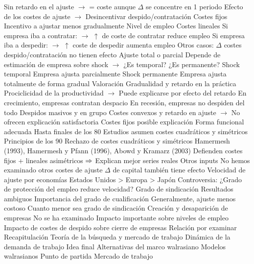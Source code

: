 \documentclass{nuevotema}
\begin{document}
\begin{esquemal}
				\4[] Sin retardo en el ajuste
				\4[] $\to$ = coste aunque $\Delta$ se concentre en 1 periodo
				\4[] Efecto de los costes de ajuste
				\4[] $\to$ Desincentivar despido/contratación
				\4 Costes fijos
				\4[] Incentivo a ajustar menos gradualmente
			\3 Nivel de empleo
				\4 Costes lineales
				\4[] Si empresa iba a contratar:
				\4[] $\to$ $\uparrow$ de coste de contratar reduce empleo
				\4[] Si empresa iba a despedir:
				\4[] $\to$ $\uparrow$ coste de despedir aumenta empleo
				\4[] Otros casos:
				\4[] $\Delta$ costes despido/contratación no tienen efecto
			\3 Ajuste total o parcial
				\4 Depende de estimación de empresa sobre shock
				\4[] $\to$ ¿Es temporal? ¿Es permanente?
				\4 Shock temporal
				\4[] Empresa ajusta parcialmente
				\4 Shock permanente
				\4[] Empresa ajusta totalmente de forma gradual
		\2 Valoración
			\3 Gradualidad y retardo en la práctica
				\4 Prociclicidad de la productividad
				\4[] $\to$ Puede explicarse por efecto del retardo
				\4[] En crecimiento, empresas contratan despacio
				\4[] En recesión, empresas no despiden del todo
				\4 Despidos masivos y en grupo
				\4[] Costes convexos y retardo en ajuste
				\4[] $\to$ No ofrecen explicación satisfactoria
				\4[] Costes fijos posible explicación
			\3 Forma funcional adecuada
				\4 Hasta finales de los 80
				\4[] Estudios asumen costes cuadráticos y simétricos
				\4 Principios de los 90
				\4[] Rechazo de costes cuadráticos y simétricos
				\4 Hamermesh (1993), Hamermesh y Pfann (1996), Abowd y Kramarz (2003)
				\4[] Defienden costes fijos + lineales asimétricos
				\4[] $\then$ Explican mejor series reales
			\3 Otros inputs
				\4 No hemos examinado otros costes de ajuste
				\4 $\Delta$ de capital también tiene efecto
			\3 Velocidad de ajuste por economías
				\4 Estados Unidos > Europa > Japón
				\4 Controversia:
				\4[] ¿Grado de protección del empleo reduce velocidad?
			\3 Grado de sindicación
				\4 Resultados ambiguos
			\3 Importancia del grado de cualificación
				\4 Generalmente, ajuste menos costoso
				\4[] Cuanto menor sea grado de sindicación
			\3 Creación y desaparición de empresas
				\4 No se ha examinado
				\4 Impacto importante sobre niveles de empleo
				\4 Impacto de costes de despido sobre cierre de empresas
				\4[$\then$] Relación por examinar
	\1[] 
		\2 Recapitulación
			\3 Teoría de la búsqueda y mercado de trabajo
			\3 Dinámica de la demanda de trabajo
		\2 Idea final
			\3 Alternativas del marco walrasiano
				\4 Modelos walrasianos
				\4[] Punto de partida
				\4 Mercado de trabajo

\end{esquemal}
\end{document}
